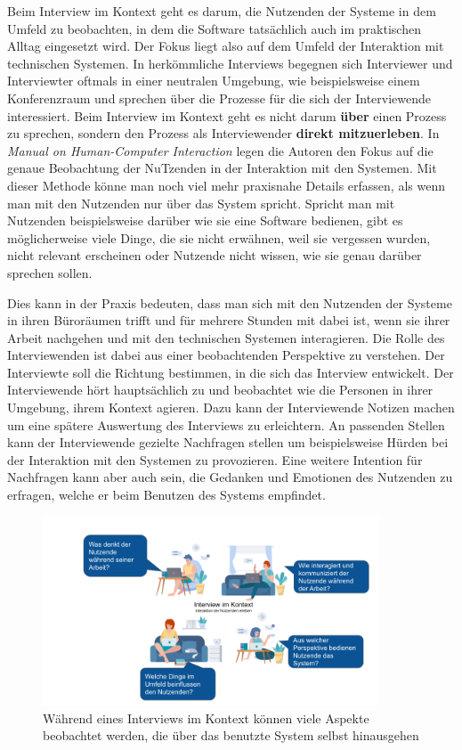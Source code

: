 \documentclass[12pt]{article}
\begin{document}
Beim Interview im Kontext geht es darum, die Nutzenden der Systeme in dem
Umfeld zu beobachten, in dem die Software tatsächlich auch im praktischen
Alltag eingesetzt wird. Der Fokus liegt also auf dem Umfeld der Interaktion mit
technischen Systemen. In herkömmliche Interviews begegnen sich Interviewer und
Interviewter oftmals in einer neutralen Umgebung, wie beispielsweise einem
Konferenzraum und sprechen über die Prozesse für die sich der Interviewende
interessiert. Beim Interview im Kontext geht es nicht darum \textbf{über} einen
Prozess zu sprechen, sondern den Prozess als Interviewender \textbf{direkt
    mitzuerleben}.\cite{contextualDesign} In \textit{Manual on Human-Computer
    Interaction} legen die Autoren den Fokus auf die genaue Beobachtung der
NuTzenden in der Interaktion mit den Systemen. Mit dieser Methode könne man
noch viel mehr praxisnahe Details erfassen, als wenn man mit den Nutzenden nur
über das System spricht. Spricht man mit Nutzenden beispielsweise darüber wie
sie eine Software bedienen, gibt es möglicherweise viele Dinge, die sie nicht
erwähnen, weil sie vergessen wurden, nicht relevant erscheinen oder Nutzende
nicht wissen, wie sie genau darüber sprechen sollen.\cite{hciHandbook}

Dies kann in der Praxis bedeuten, dass man sich mit den Nutzenden der Systeme
in ihren Büroräumen trifft und für mehrere Stunden mit dabei ist, wenn sie
ihrer Arbeit nachgehen und mit den technischen Systemen interagieren. Die Rolle
des Interviewenden ist dabei aus einer beobachtenden Perspektive zu verstehen.
Der Interviewte soll die Richtung bestimmen, in die sich das Interview
entwickelt. Der Interviewende hört hauptsächlich zu und beobachtet wie die
Personen in ihrer Umgebung, ihrem Kontext agieren.\cite{hciHandbook} Dazu kann
der Interviewende Notizen machen um eine spätere Auswertung des Interviews zu
erleichtern. An passenden Stellen kann der Interviewende gezielte Nachfragen
stellen um beispielsweise Hürden bei der Interaktion mit den Systemen zu
provozieren. Eine weitere Intention für Nachfragen kann aber auch sein, die
Gedanken und Emotionen des Nutzenden zu erfragen, welche er beim Benutzen des
Systems empfindet.

\begin{figure}[h]
    \caption{Während eines Interviews im Kontext können viele Aspekte beobachtet werden, die über das benutzte System selbst hinausgehen}
    \centering
    \includegraphics[width=10cm]{Interview im Kontext Schaubild.png}
\end{figure}
\end{document}
